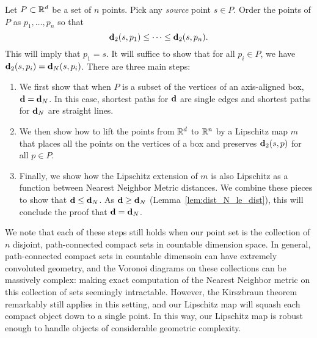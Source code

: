 \label{sec:the_proof}

  Let $P\subset \mathbb{R}^d$ be a set of $n$ points.
  Pick any \emph{source} point $s\in P$.
  Order the points of $P$ as $p_1,\ldots ,p_n$ so that
  \[
    \mathbf{d}_2(s,p_1) \le \cdots \le \mathbf{d}_2(s, p_n).
  \]
  This will imply that $p_1 = s$.
  It will suffice to show that for all $p_i\in P$, we have $\mathbf{d}_2(s,p_i) = \mathbf{d}_N(s,p_i)$.
  There are three main steps:
  \begin{enumerate}
    \item We first show that when $P$ is a subset of the vertices of an axis-aligned box, $\mathbf{d} = \mathbf{d}_N$.  In this case, shortest paths for $\mathbf{d}$ are single edges and shortest paths for $\mathbf{d}_N$ are straight lines.
    \item We then show how to lift the points from $\mathbb{R}^d$ to $\mathbb{R}^n$ by a Lipschitz map $m$ that places all the points on the vertices of a box and preserves $\mathbf{d}_2(s,p)$ for all $p\in P$.
    \item Finally, we show how the Lipschitz extension of $m$ is also Lipschitz as a function between Nearest Neighbor Metric distances.  We combine these pieces to show that $\mathbf{d} \le \mathbf{d}_N$.  As $\mathbf{d} \ge \mathbf{d}_N$ (Lemma~\ref{lem:dist_N_le_dist}), this will conclude the proof that $\mathbf{d} = \mathbf{d}_N$.
  \end{enumerate}
We note that each of these steps still holds when our point set is the
collection of $n$ disjoint, path-connected compact sets in countable
dimension space. In general, path-connected compact sets in countable
dimensoin can have extremely convoluted geometry, and the Voronoi diagrams
on these collections can be massively complex: making exact computation of the
Nearest Neighbor metric on this collection of sets seemingly intractable.
However, the Kirszbraun theorem remarkably still applies
in this setting, and our Lipschitz map will squash each compact object down
to a single point. In this way, our Lipschitz map is robust enough to
handle objects of considerable geometric complexity.
  
  
  
  
  
